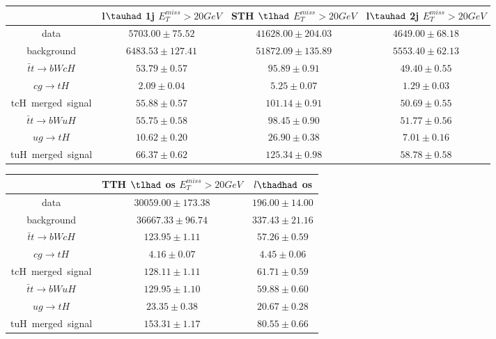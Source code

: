 \centering
\begin{tabular}{|c|c|c|c|} \hline
 & l$\tauhad$ 1j  $E_T^{miss}>20GeV$ & STH $\tlhad$   $E_T^{miss}>20GeV$ & l$\tauhad$ 2j  $E_T^{miss}>20GeV$\\\hline
data & $5703.00\pm75.52$ & $41628.00\pm204.03$ & $4649.00\pm68.18$\\\hline
background & $6483.53\pm127.41$ & $51872.09\pm135.89$ & $5553.40\pm62.13$\\\hline
$\bar{t}t\to bWcH$ & $53.79\pm0.57$ & $95.89\pm0.91$ & $49.40\pm0.55$\\\hline
$cg\to tH$ & $2.09\pm0.04$ & $5.25\pm0.07$ & $1.29\pm0.03$\\\hline
tcH~merged~signal & $55.88\pm0.57$ & $101.14\pm0.91$ & $50.69\pm0.55$\\\hline
$\bar{t}t\to bWuH$ & $55.75\pm0.58$ & $98.45\pm0.90$ & $51.77\pm0.56$\\\hline
$ug\to tH$ & $10.62\pm0.20$ & $26.90\pm0.38$ & $7.01\pm0.16$\\\hline
tuH~merged~signal & $66.37\pm0.62$ & $125.34\pm0.98$ & $58.78\pm0.58$\\\hline
\end{tabular}
\begin{tabular}{|c|c|c|} \hline
 & TTH $\tlhad$ os  $E_T^{miss}>20GeV$ & $l\thadhad$ os\\\hline
data & $30059.00\pm173.38$ & $196.00\pm14.00$\\\hline
background & $36667.33\pm96.74$ & $337.43\pm21.16$\\\hline
$\bar{t}t\to bWcH$ & $123.95\pm1.11$ & $57.26\pm0.59$\\\hline
$cg\to tH$ & $4.16\pm0.07$ & $4.45\pm0.06$\\\hline
tcH~merged~signal & $128.11\pm1.11$ & $61.71\pm0.59$\\\hline
$\bar{t}t\to bWuH$ & $129.95\pm1.10$ & $59.88\pm0.60$\\\hline
$ug\to tH$ & $23.35\pm0.38$ & $20.67\pm0.28$\\\hline
tuH~merged~signal & $153.31\pm1.17$ & $80.55\pm0.66$\\\hline
\end{tabular}
